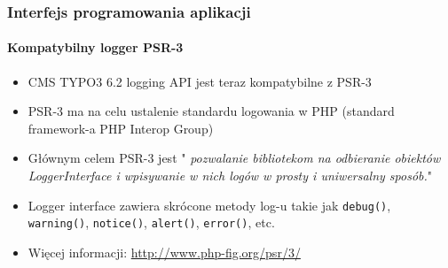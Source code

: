 \begin{frame}[fragile]
	\frametitle{Interfejs programowania aplikacji}
	\framesubtitle{Kompatybilny logger PSR-3}

	\begin{itemize}
		\item CMS TYPO3 6.2 logging API jest teraz kompatybilne z PSR-3
		\item PSR-3 ma na celu ustalenie standardu logowania w PHP (standard framework-a PHP Interop Group)

		\item Głównym celem PSR-3 jest
			"\emph{ pozwalanie bibliotekom na odbieranie obiektów LoggerInterface i wpisywanie w nich logów w prosty i uniwersalny sposób.}"

		\item Logger interface zawiera skrócone metody log-u takie jak\newline
			\texttt{debug()}, \texttt{warning()}, \texttt{notice()}, \texttt{alert()}, \texttt{error()}, etc.

		\item Więcej informacji:\newline
			\url{http://www.php-fig.org/psr/3/}

	\end{itemize}

\end{frame}


